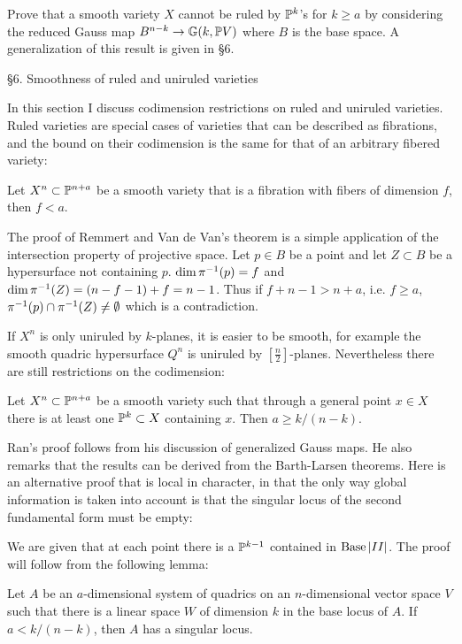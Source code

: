 Prove that a smooth variety $X$ cannot be ruled
by $\Bbb P^{k}$'s for $k\geq a$ by considering the reduced Gauss map
$B^{n-k}\rightarrow\Bbb G (k,\Bbb P V)$
where $B$ is the base space. A generalization of this result is given
in \S 6.

 

\heading \S  6. Smoothness of ruled and uniruled varieties\endheading

 In this section I discuss codimension restrictions on ruled
and uniruled varieties. Ruled varieties are special cases of
varieties that can be described as fibrations,
   and the bound
on their codimension is the same for that of an
arbitrary  fibered variety:

Let $X^n\subset\Bbb P^{n+a}$ be a smooth variety that is a fibration
with fibers
of dimension $f$, then $f< a$.\endproclaim


The proof of Remmert and Van de Van's theorem is a simple application
of the intersection property of projective space. Let $p\in B$ be
a point and let $Z\subset B$ be a hypersurface not containing $p$.
$\text{dim}\, \pi{}^{-1} (p)=f$ and $\text{dim}\,\pi{}^{-1} (Z) = (n-f-1)+f=n-1$. Thus
if $f+n-1> n+a$, i.e. $f\geq a$, $\pi{}^{-1} (p)\cap \pi{}^{-1} (Z)\neq\emptyset$
which is a contradiction.


 

If $X^n$ is only uniruled by $k$-planes, it is easier to be smooth,
for example the smooth quadric hypersurface $Q^n$ is uniruled
by $[\frac n2]$-planes. Nevertheless
there are still restrictions on the codimension:

Let $X^n\subset\Bbb P^{n+a}$ be a smooth variety
such that through a
 general point
  $x\in X$ there is at least one $\Bbb P^{k}\subset X$ containing $x$.
Then $a\geq k/(n-k)$.
\endproclaim

 
Ran's proof follows from his discussion of
generalized Gauss maps. He also remarks that the
results can be derived from the Barth-Larsen theorems.
Here is an alternative
proof that is local in character, in that the only way global information
is taken into account is that the singular locus of
the second fundamental form must be empty:
 
We are given that at each point there is a $\Bbb P^{k-1}$
contained in $\text{Base}\,| II |$. The proof will follow from
the following lemma:\enddemo

 Let $A$ be an $a$-dimensional system of quadrics
  on an $n$-dimensional vector space $V$
such that there is  a linear space
$W$  of dimension $k$ in
the base locus of $A$. If
$a<k/(n-k)$, then $A$ has a singular locus.
\endproclaim

